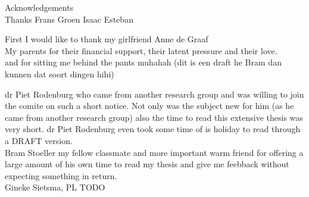 {\LARGE Acknowledgements}\\
Thanks
Frans Groen
Isaac Esteban

First I would like to thank my girlfriend Anne de Graaf\\

My parents for their financial support, their latent pressure and their love.\\
and for sitting me behind the pants muhahah (dit is een draft he Bram dan kunnen dat
soort dingen hihi)

dr Piet Rodenburg who came from another research group and was willing to join
the comite on such a short notice.  Not only was the subject new for him (as he
came from another research group) also the time to read this extensive thesis
was very short.  dr Piet Rodenburg even took some time of is holiday to read through
a DRAFT version.\\

Bram Stoeller my fellow classmate and more important warm friend for offering a large amount of
his own time to read my thesis and give me feebback without expecting something in
return.\\

Gineke Sietsma, PL
TODO
